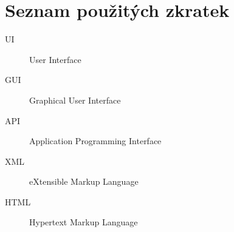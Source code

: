\documentclass[thesis=M,czech]{FITthesis}[2012/06/26]
\begin{document}
\begin{conclusion}
\end{conclusion}

\nocite{*}



\appendix

\chapter{Seznam použitých zkratek}
\begin{description}
	\item[UI] User Interface
	\item[GUI] Graphical User Interface
	\item[API] Application Programming Interface
	\item[XML] eXtensible Markup Language
	\item[HTML] Hypertext Markup Language
\end{description}
\end{document}
